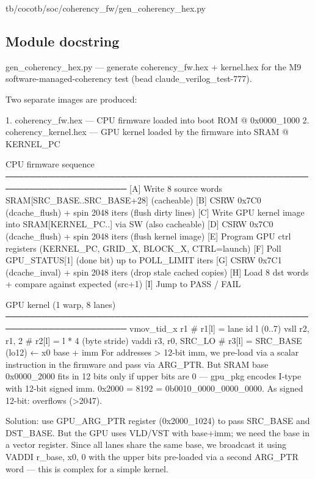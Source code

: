\begin{relocated}{tb/cocotb/soc/coherency_fw/gen_coherency_hex.py}

\subsection*{Module docstring}

\begin{textblock}
gen_coherency_hex.py — generate coherency_fw.hex + kernel.hex for the M9
software-managed-coherency test (bead claude_verilog_test-777).

Two separate images are produced:

1. coherency_fw.hex   — CPU firmware loaded into boot ROM @ 0x0000_1000
2. coherency_kernel.hex — GPU kernel loaded by the firmware into SRAM @ KERNEL_PC

CPU firmware sequence
──────────────────────────────────────────────────────────────────────
[A] Write 8 source words  SRAM[SRC_BASE..SRC_BASE+28]    (cacheable)
[B] CSRW 0x7C0 (dcache_flush)  + spin 2048 iters          (flush dirty lines)
[C] Write GPU kernel image into SRAM[KERNEL_PC..] via SW   (also cacheable)
[D] CSRW 0x7C0 (dcache_flush)  + spin 2048 iters          (flush kernel image)
[E] Program GPU ctrl registers (KERNEL_PC, GRID_X, BLOCK_X, CTRL=launch)
[F] Poll GPU_STATUS[1] (done bit) up to POLL_LIMIT iters
[G] CSRW 0x7C1 (dcache_inval) + spin 2048 iters           (drop stale cached copies)
[H] Load 8 dst words + compare against expected (src+1)
[I] Jump to PASS / FAIL

GPU kernel (1 warp, 8 lanes)
──────────────────────────────────────────────────────────────────────
vmov_tid_x  r1          # r1[l] = lane id l (0..7)
vsll        r2, r1, 2   # r2[l] = l * 4  (byte stride)
vaddi       r3, r0, SRC_LO  # r3[l] = SRC_BASE (lo12)  ← x0 base + imm
For addresses > 12-bit imm, we pre-load via a scalar instruction in the
firmware and pass via ARG_PTR. But SRAM base 0x0000_2000 fits in 12 bits
only if upper bits are 0 — gpu_pkg encodes I-type with 12-bit signed imm.
0x2000 = 8192 = 0b0010_0000_0000_0000. As signed 12-bit: overflows (>2047).

Solution: use GPU_ARG_PTR register (0x2000_1024) to pass SRC_BASE and
DST_BASE. But the GPU uses VLD/VST with base+imm; we need the base in a
vector register.  Since all lanes share the same base, we broadcast it
using VADDI r_base, x0, 0 with the upper bits pre-loaded via a second
ARG_PTR word — this is complex for a simple kernel.


\end{textblock}
\end{relocated}
